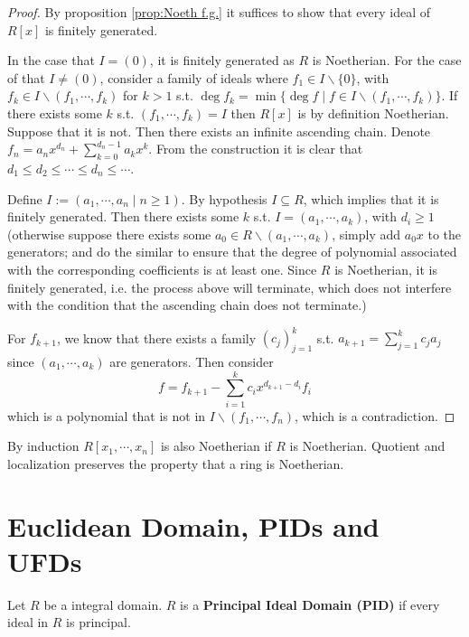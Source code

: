 \begin{proof}
    By proposition \ref{prop:Noeth f.g.} it suffices to show that every ideal of $R[x]$ is finitely generated. 

    In the case that $I = (0)$, it is finitely generated as $R$ is Noetherian. For the case of that $I \neq (0)$, consider a family of ideals where $f_1 \in I\smallsetminus\{0\}$, with $f_k \in I \smallsetminus (f_1, \cdots, f_k)$ for $k > 1$ s.t. $\deg f_k = \min \{\deg f \mid f \in I \smallsetminus (f_1, \cdots, f_k) \}$. If there exists some $k$ s.t. $(f_1, \cdots, f_k) = I$ then $R[x]$ is by definition Noetherian. Suppose that it is not. Then there exists an infinite ascending chain. Denote $f_n = a_n x^{d_n} + \sum\limits_{k=0}^{d_n - 1} a_k x^k$. From the construction it is clear that $d_1 \leq d_2 \leq\cdots\leq d_n\leq\cdots$.

    Define $I := (a_1, \cdots, a_n \mid n \geq 1)$. By hypothesis $I \subseteq R$, which implies that it is finitely generated. Then there exists some $k$ s.t. $I = (a_1, \cdots, a_k)$, with $d_i \geq 1$ (otherwise suppose there exists some $a_0\in R\smallsetminus (a_1, \cdots, a_k)$, simply add $a_0 x$ to the generators; and do the similar to ensure that the degree of polynomial associated with the corresponding coefficients is at least one. Since $R$ is Noetherian, it is finitely generated, i.e. the process above will terminate, which does not interfere with the condition that the ascending chain does not terminate.) 
    
    For $f_{k+1}$, we know that there exists a family $(c_j)_{j=1}^k$ s.t. $a_{k+1} = \sum\limits_{j=1}^k c_j a_j$ since $(a_1, \cdots, a_k)$ are generators. Then consider
    \[
        f = f_{k+1} - \sum\limits_{i=1}^k c_i x^{d_{k+1} - d_i} f_i
    \]
    which is a polynomial that is not in $I\smallsetminus (f_1, \cdots, f_n)$, which is a contradiction.
\end{proof}

\begin{corollary}
    By induction $R[x_1, \cdots, x_n]$ is also Noetherian if $R$ is Noetherian. Quotient and localization preserves the property that a ring is Noetherian.
\end{corollary}

\section{Euclidean Domain, PIDs and UFDs}

\begin{definition}
    Let $R$ be a integral domain. $R$ is a \textbf{Principal Ideal Domain (PID)} if every ideal in $R$ is principal.
\end{definition}

